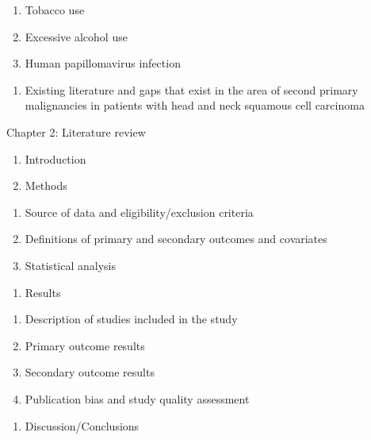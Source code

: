 \documentclass[12pt]{book}
\numberwithin{equation}{chapter}
\providecommand{\tightlist}{%
  \setlength{\itemsep}{0pt}\setlength{\parskip}{0pt}}
\begin{document}
\begin{enumerate}
\def\labelenumi{\arabic{enumi}.}
\tightlist
\item
  Tobacco use
\item
  Excessive alcohol use
\item
  Human papillomavirus infection
\end{enumerate}

\begin{enumerate}
\def\labelenumi{\Alph{enumi}.}
\setcounter{enumi}{2}
\tightlist
\item
  Existing literature and gaps that exist in the area of second primary malignancies in patients with head and neck squamous cell carcinoma
\end{enumerate}

Chapter 2: Literature review

\begin{enumerate}
\def\labelenumi{\Alph{enumi}.}
\item
  Introduction
\item
  Methods
\end{enumerate}

\begin{enumerate}
\def\labelenumi{\arabic{enumi}.}
\tightlist
\item
  Source of data and eligibility/exclusion criteria
\item
  Definitions of primary and secondary outcomes and covariates
\item
  Statistical analysis
\end{enumerate}

\begin{enumerate}
\def\labelenumi{\Alph{enumi}.}
\setcounter{enumi}{2}
\tightlist
\item
  Results
\end{enumerate}

\begin{enumerate}
\def\labelenumi{\arabic{enumi}.}
\tightlist
\item
  Description of studies included in the study
\item
  Primary outcome results
\item
  Secondary outcome results
\item
  Publication bias and study quality assessment
\end{enumerate}

\begin{enumerate}
\def\labelenumi{\Alph{enumi}.}
\setcounter{enumi}{3}
\tightlist
\item
  Discussion/Conclusions
\end{enumerate}
\end{document}
